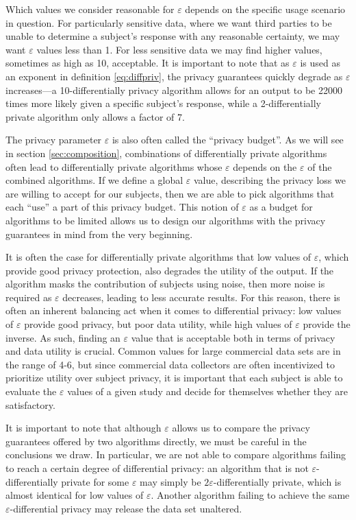 \documentclass[a4paper,12pt]{article}
\renewcommand{\epsilon}{\varepsilon}
\begin{document}
Which values we consider reasonable for $\epsilon$ depends on the specific usage scenario in question. For particularly sensitive data, where we want third parties to be unable to determine a subject's response with any reasonable certainty, we may want $\epsilon$ values less than 1. For less sensitive data we may find higher values, sometimes as high as 10, acceptable. It is important to note that as $\epsilon$ is used as an exponent in definition \ref{eq:diffpriv}, the privacy guarantees quickly degrade as $\epsilon$ increases---a 10-differentially privacy algorithm allows for an output to be 22000 times more likely given a specific subject's response, while a 2-differentially private algorithm only allows a factor of 7.

The privacy parameter $\epsilon$ is also often called the ``privacy budget''. As we will see in section \ref{sec:composition}, combinations of differentially private algorithms often lead to differentially private algorithms whose $\epsilon$ depends on the $\epsilon$ of the combined algorithms. If we define a global $\epsilon$ value, describing the privacy loss we are willing to accept for our subjects, then we are able to pick algorithms that each ``use'' a part of this privacy budget. This notion of $\epsilon$ as a budget for algorithms to be limited allows us to design our algorithms with the privacy guarantees in mind from the very beginning.

It is often the case for differentially private algorithms that low values of $\epsilon$, which provide good privacy protection, also degrades the utility of the output. If the algorithm masks the contribution of subjects using noise, then more noise is required as $\epsilon$ decreases, leading to less accurate results. For this reason, there is often an inherent balancing act when it comes to differential privacy: low values of $\epsilon$ provide good privacy, but poor data utility, while high values of $\epsilon$ provide the inverse. As such, finding an $\epsilon$ value that is acceptable both in terms of privacy and data utility is crucial. Common values for large commercial data sets \cite{apple_differential,us_census} are in the range of 4-6, but since commercial data collectors are often incentivized to prioritize utility over subject privacy, it is important that each subject is able to evaluate the $\epsilon$ values of a given study and decide for themselves whether they are satisfactory.

It is important to note that although $\epsilon$ allows us to compare the privacy guarantees offered by two algorithms directly, we must be careful in the conclusions we draw. In particular, we are not able to compare algorithms failing to reach a certain degree of differential privacy: an algorithm that is not $\epsilon$-differentially private for some $\epsilon$ may simply be $2\epsilon$-differentially private, which is almost identical for low values of $\epsilon$. Another algorithm failing to achieve the same $\epsilon$-differential privacy may release the data set unaltered.
\end{document}
